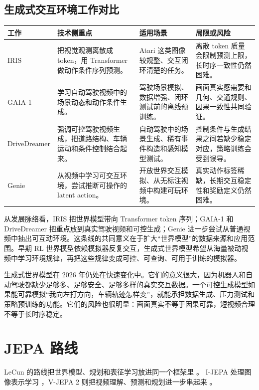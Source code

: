\documentclass[11pt,a4paper]{ctexart}
\begin{document}
\subsection{生成式交互环境工作对比}

\begin{longtable}{p{} p{} p{} p{}}
\toprule
工作 & 技术侧重点 & 适用场景 & 局限或风险 \\
\midrule
IRIS & 把视觉观测离散成 token，用 Transformer 做动作条件序列预测。 & Atari 这类图像较规整、交互闭环清楚的任务。 & 离散 token 质量会限制预测上限，长时序一致性仍然困难。 \\
GAIA-1 & 学习自动驾驶视频中的场景动态和动作条件生成。 & 驾驶场景模拟、数据增强、闭环测试前的离线预训练。 & 画面真实感需要和几何、交通规则、因果一致性共同验证。 \\
Drive\-Dreamer & 强调可控驾驶视频生成，把道路结构、车辆运动和条件控制结合起来。 & 自动驾驶中的场景生成、稀有事件构造和感知模型测试。 & 控制条件与生成结果之间若缺少稳定对应，策略训练会受到误导。 \\
Genie & 从视频中学习可交互环境，尝试推断可操作的 latent action。 & 开放世界交互模拟、从无标注视频中构建可玩环境。 & 真实动作标签稀缺，长期交互稳定性和奖励定义仍然困难。 \\
\bottomrule
\end{longtable}

从发展脉络看，IRIS 把世界模型带向 Transformer token 序列；GAIA-1 和 DriveDreamer 把重点放到真实驾驶视频和可控生成；Genie 进一步尝试从普通视频中抽出可互动环境。这条线的共同意义在于扩大“世界模型”的数据来源和应用范围。早期 RL 世界模型依赖模拟器反复交互，生成式世界模型希望从海量被动视频中学习环境规律，再把这些规律变成可控、可查询、可用于训练的模拟器。

生成式世界模型在 2026 年仍处在快速变化中。它们的意义很大，因为机器人和自动驾驶都缺少足够多、足够安全、足够多样的真实交互数据。一个可控生成模型如果能可靠模拟“我向左打方向，车辆轨迹怎样变”，就能承担数据生成、压力测试和策略预训练的功能。它们的风险也很明显：画面真实不等于因果可靠，短视频合理不等于长时序稳定。

\section{JEPA 路线}

LeCun 的路线把世界模型、规划和表征学习放进同一个框架里 \cite{lecun2022path}。
I-JEPA 处理图像表示学习 \cite{assran2023ijepa}，V-JEPA 2 则把视频理解、预测和规划进一步串起来 \cite{assran2025vjepa2}。
\end{document}
